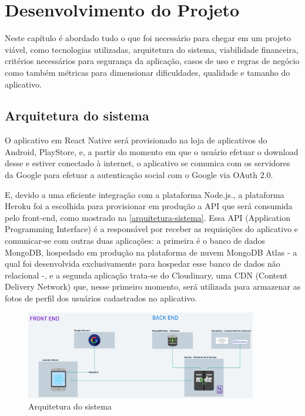 \chapter{Desenvolvimento do Projeto}

Neste capítulo é abordado tudo o que foi necessário para chegar em um projeto viável, como tecnologias utilizadas, arquitetura do sistema, viabilidade financeira, critérios necessários para segurança da aplicação, casos de uso e regras de negócio como também métricas para dimensionar dificuldades, qualidade e tamanho do aplicativo.   



\section{Arquitetura do sistema}
O aplicativo em React Native será provisionado na loja de aplicativos do Android, PlayStore, e, a partir do momento em que o usuário efetuar o download desse e estiver conectado à internet, o aplicativo se comunica com os servidores da Google para efetuar a autenticação social com o Google via OAuth 2.0. 

E, devido a uma eficiente integração com a plataforma Node.js., a plataforma Heroku foi a escolhida para provisionar em produção a API que será consumida pelo front-end, como mostrado na \autoref{arquitetura-sistema}. Essa API (Application Programming Interface) é a responsável por receber as requisições do aplicativo e comunicar-se com outras duas aplicações: a primeira é o banco de dados MongoDB, hospedado em produção na plataforma de nuvem MongoDB Atlas - a qual foi desenvolvida exclusivamente para hospedar esse banco de dados não relacional -, e a segunda aplicação trata-se do Cloudinary, uma CDN (Content Delivery Network) que, nesse primeiro momento, será utilizada para armazenar as fotos de perfil dos usuários cadastrados no aplicativo.


\begin{figure}[htb]
	\centering
	\caption{\label{fig_arq_virado}Arquitetura do sistema}
	\label{arquitetura-sistema}
	\includegraphics[width=0.9\textwidth]{anexos/poc-arquitetura.png}
\end{figure}


